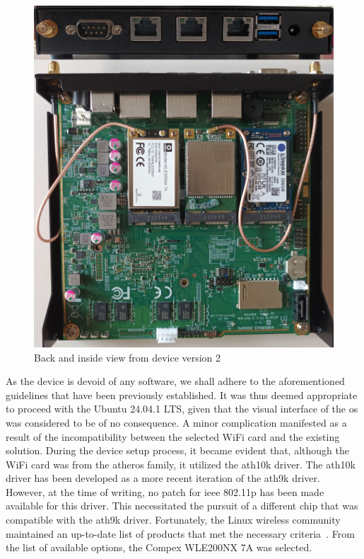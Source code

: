 \begin{figure}
	\centering
	\includegraphics[width=\textwidth]{Chapters/Figures/Implementation/devices/device_1.5.jpg}
	\caption{Back and inside view from device version 2}
	\label{fig:device_2}
\end{figure}


As the device is devoid of any software, we shall adhere to the aforementioned guidelines that have been previously established. It was thus deemed appropriate to proceed with the Ubuntu 24.04.1 LTS, given that the visual interface of the \gls{os} was considered to be of no consequence.
A minor complication manifested as a result of the incompatibility between the selected WiFi card and the existing solution. During the device setup process, it became evident that, although the WiFi card was from the atheros family, it utilized the ath10k driver. The ath10k driver has been developed as a more recent iteration of the ath9k driver. However, at the time of writing, no patch for \gls{ieee} 802.11p has been made available for this driver. This necessitated the pursuit of a different chip that was compatible with the ath9k driver. Fortunately, the Linux wireless community maintained an up-to-date list of products that met the necessary criteria~\cite{noauthor_external_nodate}. From the list of available options, the Compex WLE200NX 7A was selected.

